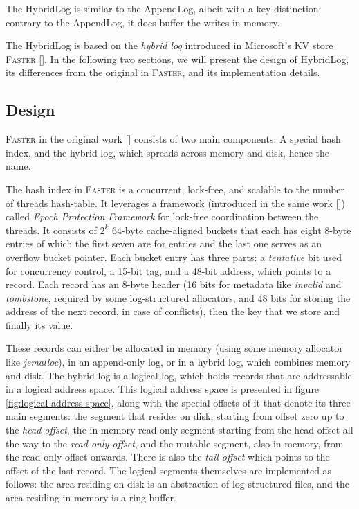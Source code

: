 The HybridLog is similar to the AppendLog, albeit with a key distinction: contrary to the AppendLog, it does buffer the writes in memory.

The HybridLog is based on the \textit{hybrid log} introduced in Microsoft's KV store \textsc{Faster} [\cite{faster}]. In the following two sections, we will present the design of HybridLog, its differences from the original in \textsc{Faster}, and its implementation details.

\subsection{Design}

\textsc{Faster} in the original work [\cite{faster}] consists of two main components: A special hash index, and the hybrid log, which spreads across memory and disk, hence the name.

The hash index in \textsc{Faster} is a concurrent, lock-free, and scalable to the number of threads hash-table. It leverages a framework (introduced in the same work [\cite{faster}]) called \textit{Epoch Protection Framework} for lock-free coordination between the threads. It consists of $2^k$ 64-byte cache-aligned buckets that each has eight 8-byte entries of which the first seven are for entries and the last one serves as an overflow bucket pointer. Each bucket entry has three parts: a \textit{tentative} bit used for concurrency control, a 15-bit tag, and a 48-bit address, which points to a record. Each record has an 8-byte header (16 bits for metadata like \textit{invalid} and \textit{tombstone}, required by some log-structured allocators, and 48 bits for storing the address of the next record, in case of conflicts), then the key that we store and finally its value.


These records can either be allocated in memory (using some memory allocator like \textit{jemalloc}), in an append-only log, or in a hybrid log, which combines memory and disk. The hybrid log is a logical log, which holds records that are addressable in a logical address space. This logical address space is presented in figure \ref{fig:logical-address-space}, along with the special offsets of it that denote its three main segments: the segment that resides on disk, starting from offset zero up to the \textit{head offset}, the in-memory read-only segment starting from the head offset all the way to the \textit{read-only offset}, and the mutable segment, also in-memory, from the read-only offset onwards. There is also the \textit{tail offset} which points to the offset of the last record.
The logical segments themselves are implemented as follows: the area residing on disk is an abstraction of log-structured files, and the area residing in memory is a ring buffer.

